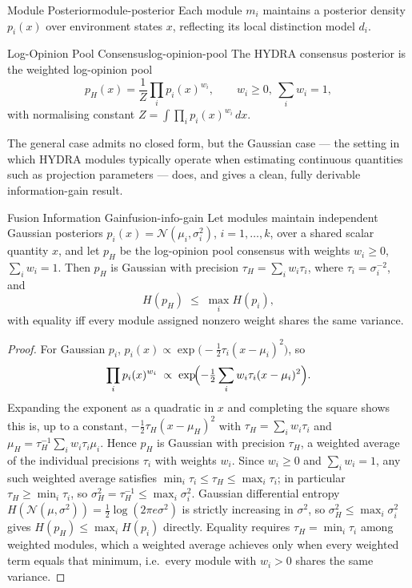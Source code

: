 \documentclass[12pt,twoside,openright]{book}
\begin{document}
\begin{definition}{Module Posterior}{module-posterior}
  Each module $m_i$ maintains a posterior density $p_i(x)$
  over environment states $x$, reflecting its local
  distinction model $d_i$.
\end{definition}

\begin{definition}{Log-Opinion Pool Consensus}{log-opinion-pool}
  The HYDRA consensus posterior is the weighted
  log-opinion pool
  \[
    p_H(x) = \frac{1}{Z} \prod_i p_i(x)^{w_i},
    \qquad w_i \ge 0,\ \sum_i w_i = 1,
  \]
  with normalising constant
  $Z = \int \prod_i p_i(x)^{w_i}\,dx$.
\end{definition}

The general case admits no closed form, but the Gaussian
case — the setting in which HYDRA modules typically operate
when estimating continuous quantities such as projection
parameters — does, and gives a clean, fully derivable
information-gain result.

\begin{theorem}{Fusion Information Gain}{fusion-info-gain}
  Let modules maintain independent Gaussian posteriors
  $p_i(x) = \mathcal{N}(\mu_i, \sigma_i^2)$,
  $i = 1, \ldots, k$, over a shared scalar quantity $x$, and
  let $p_H$ be the log-opinion pool consensus with weights
  $w_i \ge 0$, $\sum_i w_i = 1$. Then $p_H$ is Gaussian with
  precision $\tau_H = \sum_i w_i \tau_i$, where
  $\tau_i = \sigma_i^{-2}$, and
  \[
    H(p_H) \;\le\; \max_i H(p_i),
  \]
  with equality iff every module assigned nonzero weight
  shares the same variance.
\end{theorem}

\begin{proof}
  For Gaussian $p_i$,
  $p_i(x) \propto \exp\bigl(-\tfrac{1}{2}\tau_i(x-\mu_i)^2\bigr)$,
  so
  \[
    \prod_i p_i(x)^{w_i}
    \;\propto\;
    \exp\!\Bigl(
      -\tfrac{1}{2} \sum_i w_i \tau_i (x - \mu_i)^2
    \Bigr).
  \]
  Expanding the exponent as a quadratic in $x$ and
  completing the square shows this is, up to a constant,
  $-\tfrac{1}{2}\tau_H (x - \mu_H)^2$ with
  $\tau_H = \sum_i w_i \tau_i$ and
  $\mu_H = \tau_H^{-1}\sum_i w_i \tau_i \mu_i$. Hence $p_H$
  is Gaussian with precision $\tau_H$, a weighted average of
  the individual precisions $\tau_i$ with weights $w_i$.
  Since $w_i \ge 0$ and $\sum_i w_i = 1$, any such weighted
  average satisfies
  $\min_i \tau_i \le \tau_H \le \max_i \tau_i$;
  in particular $\tau_H \ge \min_i \tau_i$, so
  $\sigma_H^2 = \tau_H^{-1} \le \max_i \sigma_i^2$.
  Gaussian differential entropy
  $H(\mathcal{N}(\mu,\sigma^2)) = \tfrac{1}{2}\log(2\pi e
  \sigma^2)$ is strictly increasing in $\sigma^2$, so
  $\sigma_H^2 \le \max_i \sigma_i^2$ gives
  $H(p_H) \le \max_i H(p_i)$ directly. Equality requires
  $\tau_H = \min_i \tau_i$ among weighted modules, which a
  weighted average achieves only when every weighted term
  equals that minimum, i.e.\ every module with $w_i>0$
  shares the same variance.
\end{proof}
\end{document}
